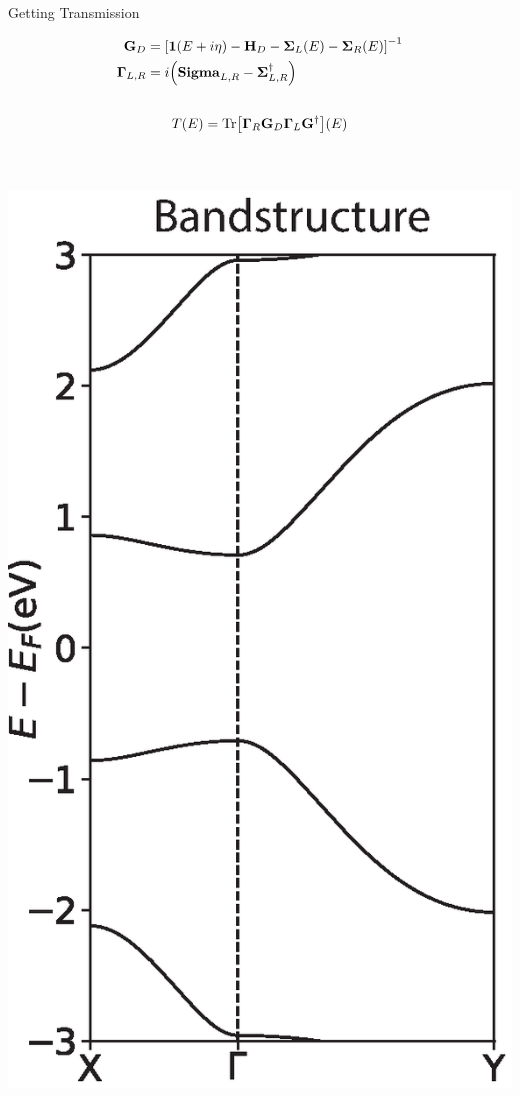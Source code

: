 \documentclass[hyperref={colorlinks=true,urlcolor=blue,linkcolor=.},aspectratio=1610,mathserif]{beamer}
\newcommand{\im}[3]{\inputminted[linenos=true, python3=true, firstline=#2, lastline=#3]{python}{#1}}
\begin{document}
\begin{frame}{Getting Transmission}
    \centering
\begin{overprint}
\begin{align*}
    \vb{G}_D &= \bqty{\vb{1}\pqty{E+i\eta}-\vb{H}_D - \vb{\Sigma}_L(E)-\vb{\Sigma}_R(E)}^{-1}\\
    \vb{\Gamma}_{L,R} &= i\pqty{\vb{Sigma}_{L,R} - \vb{\Sigma}_{L,R}^{\dagger}}
\end{align*}
\im{Listings/Functions.py}{225}{228}
\begin{align*}
    T(E) = \mathrm{Tr}\bqty{\vb{\Gamma}_R\vb{G}_D\vb{\Gamma}_L\vb{G}^{\dagger}}(E)
\end{align*}
   \begin{columns}[c]
    \im{Listings/Functions.py}{240}{243}
    \end{columns}
    \begin{columns}[c]
    \includegraphics[width=\textwidth]{Figures/PresentationBetaBands.eps}

\end{columns}
\end{overprint}
\end{frame}
\end{document}
